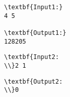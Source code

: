 \begin{verbatim}
\textbf{Input1:}
4 5

\textbf{Output1:}
128205\end{verbatim}
\begin{verbatim}
\textbf{Input2:
\\}2 1\end{verbatim}
\begin{verbatim}
\textbf{Output2:
\\}0\end{verbatim}